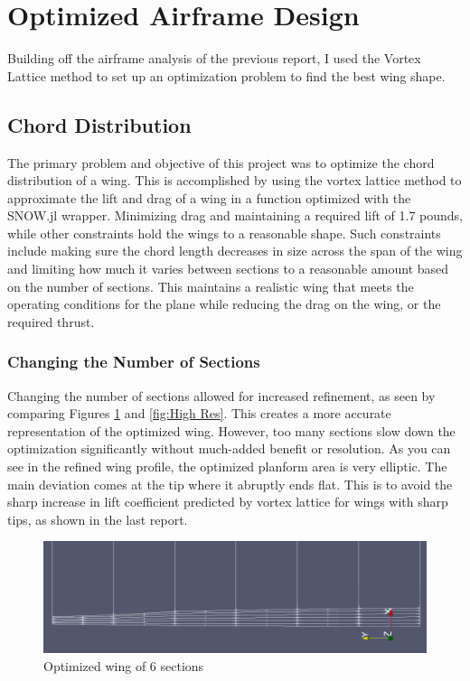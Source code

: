 \documentclass{article}
\begin{document}
\section{Optimized Airframe Design}
Building off the airframe analysis of the previous report, I used the Vortex Lattice method to set up an optimization problem to find the best wing shape.

\subsection{Chord Distribution}
The primary problem and objective of this project was to optimize the chord distribution of a wing. This is accomplished by using the vortex lattice method to approximate the lift and drag of a wing in a function optimized with the SNOW.jl wrapper. Minimizing drag and maintaining a required lift of 1.7 pounds, while other constraints hold the wings to a reasonable shape. Such constraints include making sure the chord length decreases in size across the span of the wing and limiting how much it varies between sections to a reasonable amount based on the number of sections. This maintains a realistic wing that meets the operating conditions for the plane while reducing the drag on the wing, or the required thrust.

\subsubsection{Changing the Number of Sections}
Changing the number of sections allowed for increased refinement, as seen by comparing Figures \ref{fig:Low Res} and \ref{fig:High Res}. This creates a more accurate representation of the optimized wing. However, too many sections slow down the optimization significantly without much-added benefit or resolution. As you can see in the refined wing profile, the optimized planform area is very elliptic. The main deviation comes at the tip where it abruptly ends flat. This is to avoid the sharp increase in lift coefficient predicted by vortex lattice for wings with sharp tips, as shown in the last report.

\begin{figure}[h]
\centering
\includegraphics[width=\textwidth]{LOW RES FOCUSED.png}
\caption{Optimized wing of 6 sections}
\label{fig:Low Res}
\end{figure}
\end{document}
